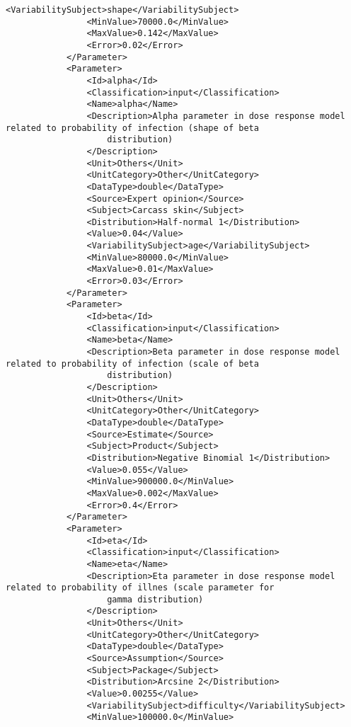\begin{lstlisting}[language=RAKIP, caption={Example of DoseResponseModel}]
                <VariabilitySubject>shape</VariabilitySubject>
                <MinValue>70000.0</MinValue>
                <MaxValue>0.142</MaxValue>
                <Error>0.02</Error>
            </Parameter>
            <Parameter>
                <Id>alpha</Id>
                <Classification>input</Classification>
                <Name>alpha</Name>
                <Description>Alpha parameter in dose response model related to probability of infection (shape of beta
                    distribution)
                </Description>
                <Unit>Others</Unit>
                <UnitCategory>Other</UnitCategory>
                <DataType>double</DataType>
                <Source>Expert opinion</Source>
                <Subject>Carcass skin</Subject>
                <Distribution>Half-normal 1</Distribution>
                <Value>0.04</Value>
                <VariabilitySubject>age</VariabilitySubject>
                <MinValue>80000.0</MinValue>
                <MaxValue>0.01</MaxValue>
                <Error>0.03</Error>
            </Parameter>
            <Parameter>
                <Id>beta</Id>
                <Classification>input</Classification>
                <Name>beta</Name>
                <Description>Beta parameter in dose response model related to probability of infection (scale of beta
                    distribution)
                </Description>
                <Unit>Others</Unit>
                <UnitCategory>Other</UnitCategory>
                <DataType>double</DataType>
                <Source>Estimate</Source>
                <Subject>Product</Subject>
                <Distribution>Negative Binomial 1</Distribution>
                <Value>0.055</Value>
                <MinValue>900000.0</MinValue>
                <MaxValue>0.002</MaxValue>
                <Error>0.4</Error>
            </Parameter>
            <Parameter>
                <Id>eta</Id>
                <Classification>input</Classification>
                <Name>eta</Name>
                <Description>Eta parameter in dose response model related to probability of illnes (scale parameter for
                    gamma distribution)
                </Description>
                <Unit>Others</Unit>
                <UnitCategory>Other</UnitCategory>
                <DataType>double</DataType>
                <Source>Assumption</Source>
                <Subject>Package</Subject>
                <Distribution>Arcsine 2</Distribution>
                <Value>0.00255</Value>
                <VariabilitySubject>difficulty</VariabilitySubject>
                <MinValue>100000.0</MinValue>

\end{lstlisting}
